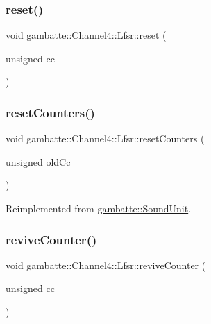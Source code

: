 \subsubsection{\texorpdfstring{reset()}{reset()}}
{\footnotesize\ttfamily void gambatte\+::\+Channel4\+::\+Lfsr\+::reset (\begin{DoxyParamCaption}\item[{unsigned}]{cc }\end{DoxyParamCaption})}

\mbox{\label{classgambatte_1_1Channel4_1_1Lfsr_acdeb93a45132b45567f97878ed6306b9}} 
\subsubsection{\texorpdfstring{reset\+Counters()}{resetCounters()}}
{\footnotesize\ttfamily void gambatte\+::\+Channel4\+::\+Lfsr\+::reset\+Counters (\begin{DoxyParamCaption}\item[{unsigned}]{old\+Cc }\end{DoxyParamCaption})\hspace{0.3cm}{\ttfamily [virtual]}}



Reimplemented from \hyperlink{classgambatte_1_1SoundUnit_a3baa270f75463b24cd79fe5970103d4f}{gambatte\+::\+Sound\+Unit}.

\mbox{\label{classgambatte_1_1Channel4_1_1Lfsr_a6cbac4af17a2cb4cc35ef46d850ed2dd}} 
\subsubsection{\texorpdfstring{revive\+Counter()}{reviveCounter()}}
{\footnotesize\ttfamily void gambatte\+::\+Channel4\+::\+Lfsr\+::revive\+Counter (\begin{DoxyParamCaption}\item[{unsigned}]{cc }\end{DoxyParamCaption})}

